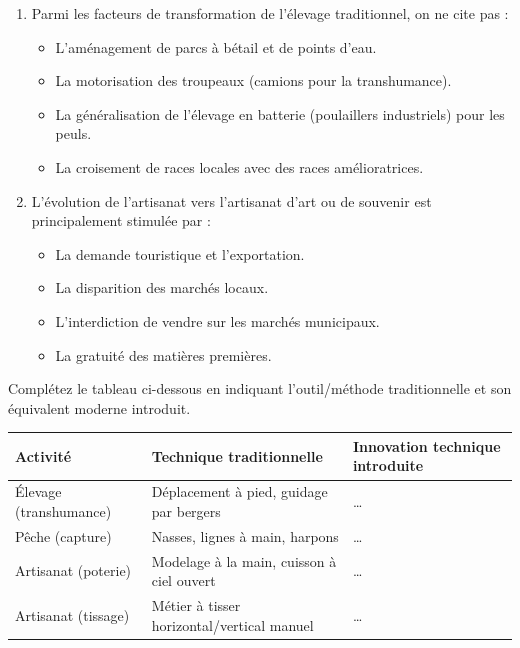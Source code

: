\documentclass[11pt]{article}
\begin{document}
\begin{exercice}
\begin{enumerate}
    \item Parmi les facteurs de transformation de l'élevage traditionnel, on ne cite pas :
    \begin{itemize}
        \item[a)] L'aménagement de parcs à bétail et de points d'eau.
        \item[b)] La motorisation des troupeaux (camions pour la transhumance).
        \item[c)] La généralisation de l'élevage en batterie (poulaillers industriels) pour les peuls.
        \item[d)] La croisement de races locales avec des races amélioratrices.
    \end{itemize}
    \item L'évolution de l'artisanat vers l'artisanat d'art ou de souvenir est principalement stimulée par :
    \begin{itemize}
        \item[a)] La demande touristique et l'exportation.
        \item[b)] La disparition des marchés locaux.
        \item[c)] L'interdiction de vendre sur les marchés municipaux.
        \item[d)] La gratuité des matières premières.
    \end{itemize}
\end{enumerate}
\end{exercice}

\begin{exercice}
Complétez le tableau ci-dessous en indiquant l'outil/méthode traditionnelle et son équivalent moderne introduit.

\begin{tabularx}{\linewidth}{|X|X|X|}
\hline
\textbf{Activité} & \textbf{Technique traditionnelle} & \textbf{Innovation technique introduite} \\
\hline
Élevage (transhumance) & Déplacement à pied, guidage par bergers & \ldots \\
\hline
Pêche (capture) & Nasses, lignes à main, harpons & \ldots \\
\hline
Artisanat (poterie) & Modelage à la main, cuisson à ciel ouvert & \ldots \\
\hline
Artisanat (tissage) & Métier à tisser horizontal/vertical manuel & \ldots \\
\hline
\end{tabularx}
\end{exercice}
\end{document}
